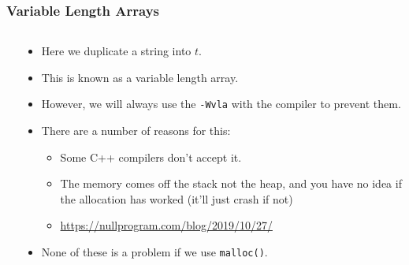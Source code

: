 \begin{frame}[fragile]
\frametitle{Variable Length Arrays}
\begin{columns}[T]

\begin{column}{0.35\textwidth}

\end{column}

\pause
\begin{column}{0.55\textwidth}
\begin{itemize}[<+->]
\item Here we duplicate a string into $t$.
\item This is known as a variable length array.
\item However, we will always use the \verb^-Wvla^ with the compiler to prevent them.
\item There are a number of reasons for this:
\begin{itemize}
\item Some C++ compilers don't accept it.
\item The memory comes off the stack not the heap, and
you have no idea if the allocation has worked (it'll just crash if not)
\item \url{https://nullprogram.com/blog/2019/10/27/}
\end{itemize}
\item None of these is a problem if we use \verb^malloc()^.
\end{itemize}
\end{column}

\end{columns}
\end{frame}



